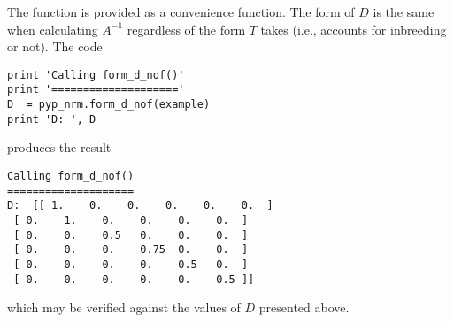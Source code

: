 The function  is provided as a convenience function. The form of $D$ is the same when calculating $A^{-1}$ regardless of the form $T$ takes (i.e., accounts for inbreeding or not). The code
\begin{verbatim}
print 'Calling form_d_nof()'
print '===================='
D  = pyp_nrm.form_d_nof(example)
print 'D: ', D
\end{verbatim}
produces the result
\begin{verbatim}
Calling form_d_nof()
====================
D:  [[ 1.    0.    0.    0.    0.    0.  ]
 [ 0.    1.    0.    0.    0.    0.  ]
 [ 0.    0.    0.5   0.    0.    0.  ]
 [ 0.    0.    0.    0.75  0.    0.  ]
 [ 0.    0.    0.    0.    0.5   0.  ]
 [ 0.    0.    0.    0.    0.    0.5 ]]
\end{verbatim}
which may be verified against the values of $D$ presented above.